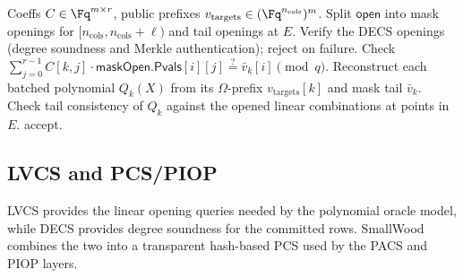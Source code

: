 \begin{algorithm}[H]
\caption{\textsf{LVCS.EvalStep2}(\(\{\bar v_k\},E,\mathsf{open},C,v_{\mathrm{targets}}\)) (verifier)}
\label{alg:lvcs-evalstep2}
\begin{algorithmic}[1]
\Require Coeffs \(C\in\Fq^{m\times r}\), public prefixes \(v_{\mathrm{targets}}\in(\Fq^{n_{\mathrm{cols}}})^{m}\).
\State Split \(\mathsf{open}\) into mask openings for \([n_{\mathrm{cols}},n_{\mathrm{cols}}+\ell)\) and tail openings at \(E\).
\State Verify the DECS openings (degree soundness and Merkle authentication); reject on failure.
  \State Check \(\sum_{j=0}^{r-1} C[k,j]\cdot \mathsf{maskOpen.Pvals}[i][j] \stackrel{?}{=} \bar v_k[i]\pmod q\).
\EndFor
\State Reconstruct each batched polynomial \(Q_k(X)\) from its \(\Omega\)-prefix \(v_{\mathrm{targets}}[k]\) and mask tail \(\bar v_k\).
\State Check tail consistency of \(Q_k\) against the opened linear combinations at points in \(E\).
\State \Return accept.
\end{algorithmic}
\end{algorithm}

\subsection{LVCS and PCS/PIOP}
LVCS provides the linear opening queries needed by the polynomial oracle model,
while DECS provides degree soundness for the committed rows. SmallWood combines
the two into a transparent hash-based PCS used by the PACS and PIOP layers.


